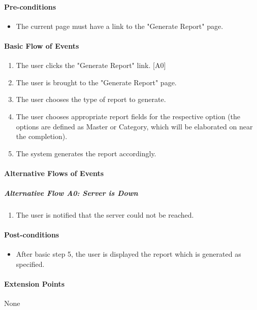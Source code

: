 \documentclass{article}
\begin{document}
\paragraph{Pre-conditions}
\begin{itemize}
\item The current page must have a link to the "Generate Report" page.
\end{itemize}

\paragraph{Basic Flow of Events}
\begin{enumerate}
\item The user clicks the "Generate Report" link. [A0]
\item The user is brought to the "Generate Report" page.
\item The user chooses the type of report to generate.
\item The user chooses appropriate report fields for the respective option (the options are defined as Master or Category, which will be elaborated on near the completion).
\item The system generates the report accordingly.
\end{enumerate}

\paragraph{Alternative Flows of Events}

\subparagraph{Alternative Flow A0: Server is Down}
\begin{enumerate}
\item The user is notified that the server could not be reached.
\end{enumerate}

\paragraph{Post-conditions}
\begin{itemize}
\item After basic step 5, the user is displayed the report which is generated as specified.
\end{itemize}

\paragraph{Extension Points}
None
\end{document}
